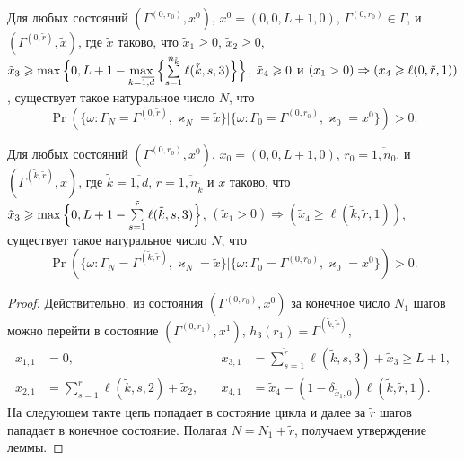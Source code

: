 \documentclass[a4paper,12pt,russian]{extarticle}
\begin{document}
\begin{lemma}
Для любых состояний $(\Gamma^{(0,r_0)},x^0)$, $x^0=(0,0,L+1,0)$, $\Gamma^{(0,r_0)} \in \Gamma$, и
$(\Gamma^{(0,\tilde{r})},\tilde{x})$,
где $\tilde{x}$ таково, что $\tilde{x}_1 \geqslant 0$, $\tilde{x}_2\geqslant 0$, $\tilde{x}_3\hm\geqslant \max{}\Bigl\{0,L+1\hm-\max\limits_{k=\overline{1,d}}{\Bigl\{\sum\limits_{s=1}^{n_{\tilde{k}}} \ell(\tilde{k},s,3)\Bigr\}}\Bigr\}$, $\tilde{x}_4\hm\geqslant 0$ и $(x_1 > 0)\hm\Rightarrow (x_4\geqslant \ell(0,\tilde{r},1))$, существует такое натуральное число $N$, что 
\begin{equation*}
\Pr(\{\omega\colon \Gamma_{N}=\Gamma^{(0,\tilde{r} )}, \varkappa_{N}=\tilde{x}\}|\{\omega\colon 
\Gamma_{0}=\Gamma^{(0,r_0)}, \varkappa_{0}=x^0\})>0.
\end{equation*}
\end{lemma}

\begin{lemma}
Для любых состояний $(\Gamma^{(0,r_0)},x^0)$, $x_0=(0,0,L+1,0)$, $r_0=\overline{1,n_0}$, и
$(\Gamma^{(\tilde{k},\tilde{r})},\tilde{x})$,
где $\tilde{k}=\overline{1,d}$, $\tilde{r} = \overline{1,n_{\tilde{k}}}$ и $\tilde{x}$ таково, что $\tilde{x}_3\geqslant \max{\Bigl\{0,L+1-\sum\limits_{s=1}^{\tilde{r}}\ell(\tilde{k},s,3)\Bigr\}}$,
$(\tilde{x}_1>0) \Rightarrow (\tilde{x}_4\geqslant \ell(\tilde{k},\tilde{r},1))$, существует такое натуральное число $N$, что 
\begin{equation*}
\Pr(\{\omega\colon \Gamma_{N}=\Gamma^{(\tilde{k},\tilde{r} )}, \varkappa_{N}=\tilde{x}\}|\{\omega\colon 
\Gamma_{0}=\Gamma^{(0,r_0)}, \varkappa_{0}=x^0\})>0.
\end{equation*}
\end{lemma}
\begin{proof}
Действительно, из состояния $(\Gamma^{(0,r_0)},x^0)$ за конечное число $N_1$ шагов можно перейти в состояние $(\Gamma^{(0,r_1)},x^1)$, $h_3(r_1)=\Gamma^{(\tilde{k},\tilde{r})}$,
\begin{align*}
x_{1,1}&=0,& \quad x_{3,1}&=\sum_{s=1}^{\tilde{r}} \ell(\tilde{k},s,3) +\tilde{x}_3\geqslant L+1, \\
x_{2,1}&=\sum_{s=1}^{\tilde{r}} \ell(\tilde{k},s,2) + \tilde{x}_2,& \quad x_{4,1}&=\tilde{x}_4 -  (1- \delta_{\tilde{x}_1,0}) \ell(\tilde{k},\tilde{r},1).
\end{align*}
На следующем такте цепь попадает в состояние цикла и далее за $\tilde{r}$ шагов пападает в конечное состояние. Полагая $N=N_1+\tilde{r}$, получаем утверждение леммы.
\end{proof}
\end{document}
